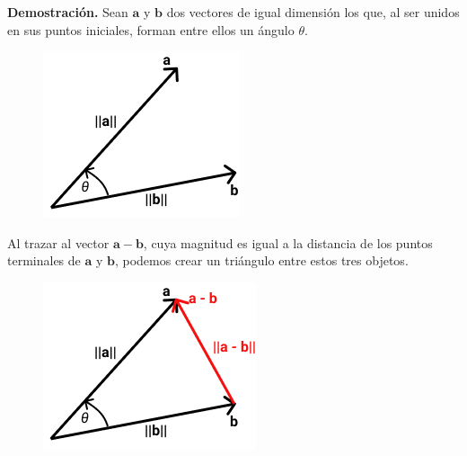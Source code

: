 \documentclass[12pt]{article}
\begin{document}
\textbf{Demostración.} Sean $\mathbf{a}$ y $\mathbf{b}$ dos vectores de igual dimensión los que, al ser unidos en sus puntos iniciales, forman entre ellos un ángulo $\theta$.

\begin{figure}[hbt!]
\centering
\includegraphics[scale=0.6]{img/dot-product-1.jpg}
\end{figure}

Al trazar al vector $\mathbf{a} - \mathbf{b}$, cuya magnitud es igual a la distancia de los puntos terminales de $\mathbf{a}$ y $\mathbf{b}$, podemos crear un triángulo entre estos tres objetos.

\begin{figure}[hbt!]
\centering
\includegraphics[scale=0.6]{img/dot-product-2.jpg}
\end{figure}
\end{document}
